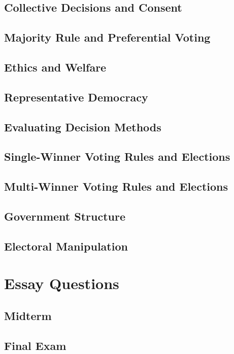 \subsection{Collective Decisions and Consent}

\subsection{Majority Rule and Preferential Voting}

\subsection{Ethics and Welfare}

\subsection{Representative Democracy}

\subsection{Evaluating Decision Methods}

\subsection{Single-Winner Voting Rules and Elections}

\subsection{Multi-Winner Voting Rules and Elections}

\subsection{Government Structure}

\subsection{Electoral Manipulation}

\section{Essay Questions}

\subsection{Midterm}

\subsection{Final Exam}